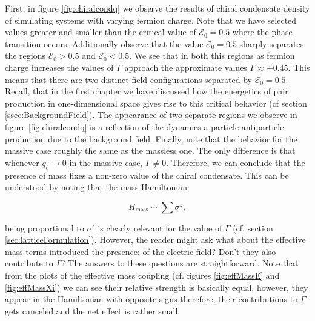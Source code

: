 First, in figure \ref{fig:chiralcondq} we observe the results of chiral condensate density of simulating systems with varying fermion charge. Note that we have selected values greater and smaller than the critical value of $\mathcal{E}_0=0.5$ where the phase transition occurs. Additionally observe that the value $\mathcal{E}_0=0.5$ sharply separates the regions $\mathcal{E}_0>0.5$ and $\mathcal{E}_0<0.5$. We see that in both this regions as fermion charge increases the values of $\Gamma$ approach the approximate values $\Gamma \approx \pm 0.45 $. This means that there are two distinct field configurations separated by $\mathcal{E}_0=0.5$. Recall, that in the first chapter we have discussed how the energetics of pair production in one-dimensional space gives rise to this critical behavior (cf section \ref{ssec:BackgroundField}). The appearance of two separate regions we observe in figure \ref{fig:chiralcondq} is a reflection of the dynamics a particle-antiparticle production due to the background field. Finally, note that the behavior for the massive case roughly the same as the massless one. The only difference is that whenever $q_e\to0$ in the massive case, $\Gamma\neq0$. Therefore, we can conclude that the presence of mass fixes a non-zero value of the chiral condensate. This can be understood by noting that the mass Hamiltonian 

\begin{equation*}
	H_{\text{mass}}\sim \sum \sigma^z,
\end{equation*}

being proportional to $\sigma^z$ is clearly relevant for the value of $\Gamma$ (cf. section \ref{sec:latticeFormulation}). However, the reader might ask what about the effective mass terms introduced the presence: of the electric field? Don't they also contribute to $\Gamma$? The answers to these questions are straightforward. Note that from the plots of the effective mass coupling (cf. figures \ref{fig:effMassE} and \ref{fig:effMassXi}) we can see their relative strength is basically equal, however, they appear in the Hamiltonian with opposite signs therefore, their contributions to $\Gamma$ gets canceled and the net effect is rather small.\\

